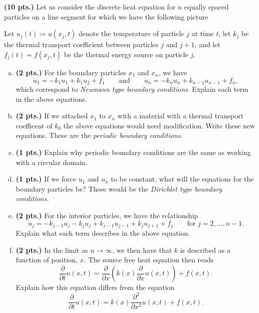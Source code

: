 \documentclass[12pt]{article} %
\begin{document}
\begin{problem}
\textbf{(10 pts.)} Let us consider the discrete heat equation for $n$ equally spaced particles on a line segment for which we have the following picture
\begin{figure}[H]
	\centering
	\resizebox{.9\columnwidth}{!}{}
\end{figure}
Let $u_j(t) \coloneqq u(x_j,t)$ denote the temperature of particle $j$ at time $t$, let $k_j$ be the thermal transport coefficient between particles $j$ and $j+1$, and let $f_j(t)=f(x_j,t)$ be the thermal energy source on particle $j$.
\begin{enumerate}[(a)]
    \item \textbf{(2 pts.)} For the boundary particles $x_1$ and $x_n$, we have
    \[
    \dot{u}_1 = -k_1 u_1 + k_1 u_{2} + f_1 \qquad \textrm{and} \qquad \dot{u}_n = -k_n u_{n} + k_{n-1} u_{n-1} +f_n,
    \]
    which correspond to \emph{Neumann type boundary conditions}. Explain each term in the above equations.
    \item \textbf{(2 pts.)} If we attached $x_1$ to $x_n$ with a material with a thermal transport coefficent of $k_0$ the above equations would need modification. Write these new equations. These are the \emph{periodic boundary conditions}. 
    \item \textbf{(1 pts.)} Explain why periodic boundary conditions are the same as working with a circular domain.
    \item \textbf{(1 pts.)} If we force $u_1$ and $u_n$ to be constant, what will the equations for the boundary particles be? These would be the \emph{Dirichlet type boundary conditions}.
    \item \textbf{(2 pts.)} For the interior particles, we have the relationship
    \[
    \dot{u}_j = -k_{j-1}u_j - k_{j} u_j + k_{j-1}u_{j-1} + k_{j} u_{j+1} +f_j \qquad \textrm{for $j=2,\dots,n-1$}.
    \]
    Explain what each term describes in the above equation.
    \item \textbf{(2 pts.)} In the limit as $n\to \infty$, we then have that $k$ is described as a function of position, $x$. The source free heat equation then reads
    \[
    \frac{\partial}{\partial t}u(x,t) = \frac{\partial}{\partial x} \left( k(x)\frac{\partial}{\partial x} u(x,t) \right) + f(x,t).
    \]
    Explain how this equation differs from the equation
    \[
    \frac{\partial}{\partial t}u(x,t) = k(x) \frac{\partial^2}{\partial x^2} u(x,t)+f(x,t).
    \]
\end{enumerate}
\end{problem}
\end{document}
